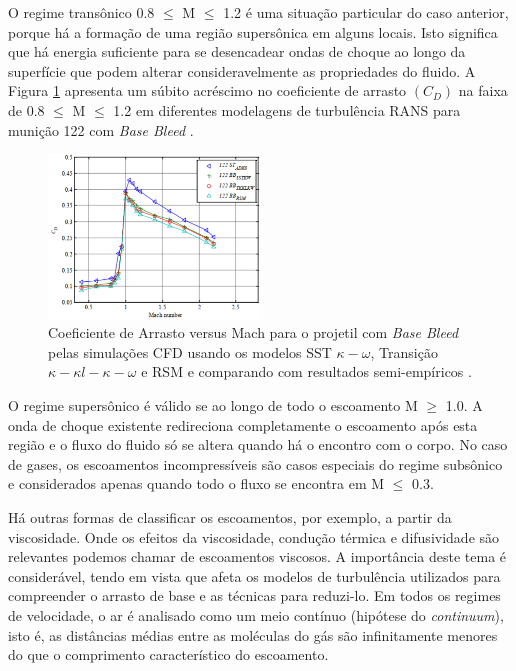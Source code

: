 O regime transônico \num{0,8} \(\leq\) M \(\leq\) \num{1,2} é uma situação particular do caso anterior, porque há a formação de uma região supersônica em alguns locais. Isto significa que há energia suficiente para se desencadear ondas de choque ao longo da superfície que podem alterar consideravelmente as propriedades do fluido. A Figura \ref{fig:dali2018b} apresenta um súbito acréscimo no coeficiente de arrasto \(\left(C_D\right)\) na faixa de \num{0,8} \(\leq\) M \(\leq\) \num{1,2} em diferentes modelagens de turbulência RANS para munição \qty{122}{\millimetre} com \textit{Base Bleed} \cite{Dali2018b}.

\begin{figure}[!ht]
	\centering
    \includegraphics[width=0.5\textwidth]{foto01-dali2018b.png}
	\caption[Coeficiente de Arrasto versus Mach para o projetil com \textit{Base Bleed} pelas simulações CFD usando os modelos SST \(\kappa-\omega\), Transição \(\kappa-\kappa l-\kappa-\omega\) e RSM e comparando com resultados semi-empíricos.]{Coeficiente de Arrasto versus Mach para o projetil com \textit{Base Bleed} pelas simulações CFD usando os modelos SST \(\kappa-\omega\), Transição \(\kappa-\kappa l-\kappa-\omega\) e RSM e comparando com resultados semi-empíricos \cite{Dali2018b}.}
	\label{fig:dali2018b}
\end{figure}

O regime supersônico é válido se ao longo de todo o escoamento M \(\geq\) \num{1,0}. A onda de choque existente redireciona completamente o escoamento após esta região e o fluxo do fluido só se altera quando há o encontro com o corpo. No caso de gases, os escoamentos incompressíveis são casos especiais do regime subsônico e considerados apenas quando todo o fluxo se encontra em M \(\leq\) \num{0,3}.

Há outras formas de classificar os escoamentos, por exemplo, a partir da viscosidade. Onde os efeitos da viscosidade, condução térmica e difusividade são relevantes podemos chamar de escoamentos viscosos. A importância deste tema é considerável, tendo em vista que afeta os modelos de turbulência utilizados para compreender o arrasto de base e as técnicas para reduzi-lo. Em todos os regimes de velocidade, o ar é analisado como um meio contínuo (hipótese do \textit{continuum}), isto é, as distâncias médias entre as moléculas do gás são infinitamente menores do que o comprimento característico do escoamento.

